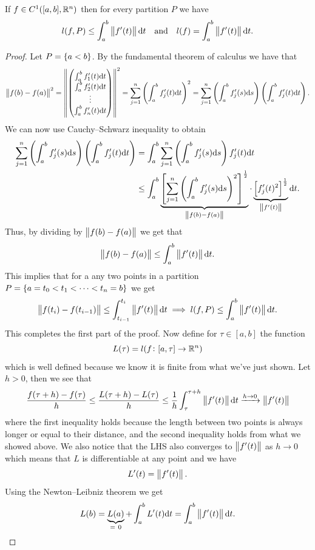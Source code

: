 \documentclass[11pt,a4paper]{article}
\begin{document}
\begin{proposition}
  If $f \in C^1([a,b], \mathbb{R}^n)$
  then for every partition $P$ we have 
  \[
    l(f,P) \le \int_{a}^{b} \left\lVert f'(t)\right\rVert \mathrm{d} t \quad \text{and} \quad 
    l(f) = \int_{a}^{b} \left\lVert f'(t)\right\rVert \mathrm{d} t.
  \]
\end{proposition}
\begin{proof}
  Let $P = \left\{a < b\right\}$.
  By the fundamental theorem of calculus we have that
  \[
    \norm{f(b) - f(a)}^2 =
    \norm{\begin{pmatrix} \int_{a}^{b} f'_1(t) \dt \\ \int_{a}^{b} f'_2(t) \dt
    \\ \vdots \\ \int_{a}^{b} f'_n(t) \dt \end{pmatrix}}^2 =
    \sum_{j=1}^{n} \del{\int_{a}^{b} f'_j(t) \dt}^2 =
    \sum_{j=1}^{n}
    \del{\int_{a}^{b} f'_j(s) \ds} \del{\int_{a}^{b} f'_j(t) \dt}.
  \]
  We can now use Cauchy--Schwarz inequality to obtain
  \begin{align*}
    \sum_{j=1}^{n}
    \del{\int_{a}^{b} f'_j(s) \ds} \del{\int_{a}^{b} f'_j(t) \dt} &=
    \int_{a}^{b} \sum_{j=1}^{n} \del{\int_{a}^{b} f'_j(s) \ds} f'_j(t) \dt 
                                                               \\ &\le
    \int_{a}^{b}
    \underbrace{
    \left[\sum_{j=1}^{n} \del{\int_{a}^{b} f'_j(s) \ds}^2\right]^{\half}}_{\norm{f(b) - f(a)}} \cdot
    \underbrace{\left[f'_j(t)^2 \right]^{\half}}_{\norm{f'(t)}} \dt.
  \end{align*}
  Thus, by dividing by $\left\lVert f(b) - f(a)\right\rVert$ we get that
  \[
    \left\lVert f(b) - f(a)\right\rVert \le
    \int_{a}^{b} \left\lVert f'(t)\right\rVert \mathrm{d} t.
  \]
  This implies that for a any two points in a partition
  $P = \left\{a = t_0 < t_1 < \cdots < t_n = b\right\}$ we get
  \[
    \left\lVert f(t_i) - f(t_{i-1})\right\rVert \le
    \int_{t_{i-1}}^{t_i} \left\lVert f'(t)\right\rVert \mathrm{d} t \implies
    l(f,P) \le \int_{a}^{b} \left\lVert f'(t)\right\rVert \mathrm{d} t.
  \]
  This completes the first part of the proof.
  Now define for $\tau \in [a,b]$ the function
  \[
    L(\tau) = l(f \colon [a,\tau] \to \mathbb{R}^n)
  \]
  which is well defined because we know it is finite from what we've
  just shown.
  Let $h > 0$, then we see that
  \[
    \frac{f(\tau + h) - f(\tau)}{h} \le
    \frac{L(\tau + h) - L(\tau)}{h} \le
    \frac{1}{h} \int_{\tau}^{\tau+h} \left\lVert f'(t)\right\rVert \mathrm{d} t
    \xrightarrow{h \to 0} \left\lVert f'(t)\right\rVert
  \]
  where the first inequality holds because the length between two points
  is always longer or equal to their distance,
  and the second inequality holds from what we showed above.
  We also notice that the LHS also converges to $\left\lVert f'(t)\right\rVert$ as
  $h \to 0$ which means that $L$ is differentiable at any point
  and we have
  \[
    L'(t) = \left\lVert f'(t)\right\rVert.
  \]
  Using the Newton--Leibniz theorem we get
  \[
    L(b) =
    \underbrace{L(a)}_{=\ 0} + \int_{a}^{b} L'(t) \mathrm{d} t =
    \int_{a}^{b} \left\lVert f'(t)\right\rVert \mathrm{d} t.
  \]
\end{proof}
\end{document}
